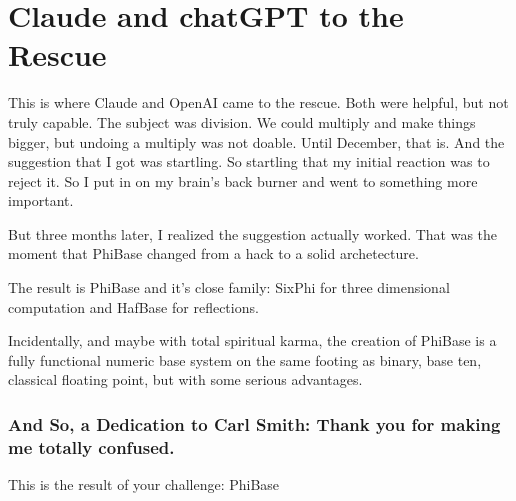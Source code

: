 \section*{Claude and chatGPT to the Rescue}

This is where Claude and OpenAI came to the rescue. Both were helpful, but not truly capable. The subject was division. We could multiply and make things bigger, but undoing a multiply was not doable. Until December, that is. And the suggestion that I got was startling. So startling that my initial reaction was to reject it. So I put in on my brain's back burner and went to something more important.

But three months later, I realized the suggestion actually worked. That was the moment that PhiBase changed from a hack to a solid archetecture.

The result is PhiBase and it's close family: SixPhi for three dimensional computation and HafBase for reflections.

Incidentally, and maybe with total spiritual karma, the creation of PhiBase is a fully functional numeric base system on the same footing as binary, base ten, classical floating point, but with some serious advantages.

\subsubsection{And So, a Dedication to Carl Smith: Thank you for making me totally confused.}\label{and-so-a-dedication-to-carl-smith-thank-you-for-making-me-totally-confused.}

This is the result of your challenge: PhiBase
